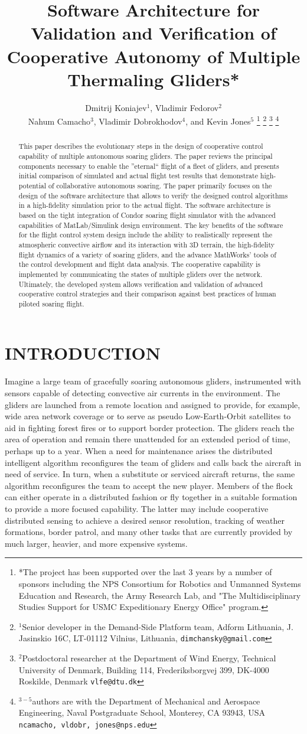 \documentclass[letterpaper, 10 pt, conference]{ieeeconf}  %
\title{\LARGE \bf
Software Architecture for Validation and Verification of Cooperative Autonomy of Multiple
Thermaling Gliders*
}
\author{Dmitrij Koniajev$^{1}$, Vladimir Fedorov$^{2}$ \\
    Nahum Camacho$^{3}$, Vladimir Dobrokhodov$^{4}$, and Kevin Jones$^{5}$%
\thanks{*The project has been supported over the last 3 years by a number of
sponsors including the NPS Consortium for Robotics and Unmanned Systems
Education and Research, the Army Research Lab, and "The Multidisciplinary
Studies Support for USMC Expeditionary Energy Office" program.}%
\thanks{$^{1}$Senior developer in the Demand-Side Platform team,
        Adform Lithuania, J. Jasinskio 16C, LT-01112 Vilnius, Lithuania,
        {\tt\small {dimchansky@gmail.com}}}%
\thanks{$^{2}$Postdoctoral researcher at the Department of Wind Energy,
        Technical University of Denmark, Building 114, Frederiksborgvej 399, DK-4000 Roskilde, Denmark
        {\tt\small {vlfe@dtu.dk}}}%
\thanks{$^{3-5}$authors are with the Department of Mechanical and Aerospace Engineering,
        Naval Postgraduate School, Monterey, CA 93943, USA
        {\tt\small {ncamacho, vldobr, jones}@nps.edu}}%
} %
\begin{document}
\maketitle
\thispagestyle{empty}
\pagestyle{empty}


\begin{abstract}
This paper describes the evolutionary steps in the design of cooperative
control capability of multiple autonomous soaring gliders. The paper
reviews the principal components necessary to enable the ''eternal`` flight
of a fleet of gliders, and presents initial comparison of simulated and
actual flight test results that demonstrate high-potential of collaborative
autonomous soaring. The paper primarily focuses on the design of the
software architecture that allows to verify the designed control algorithms
in a high-fidelity simulation prior to the actual flight. The software
architecture is based on the tight integration of Condor soaring flight
simulator with the advanced capabilities of MatLab/Simulink design
environment. The key benefits of the software for the flight control system
design include the ability to realistically represent the atmospheric
convective airflow and its interaction with 3D terrain, the high-fidelity
flight dynamics of a variety of soaring gliders, and the advance MathWorks'
tools of the control development and flight data analysis. The cooperative
capability is implemented by communicating the states of multiple gliders
over the network. Ultimately, the developed system allows verification and
validation of advanced cooperative control strategies and their comparison
against best practices of human piloted soaring flight.
\end{abstract}


\section{INTRODUCTION}

Imagine a large team of gracefully soaring autonomous gliders, instrumented
with sensors capable of detecting convective air currents in the environment.
The gliders are launched from a remote location and assigned to provide, for
example, wide area network coverage or to serve as pseudo Low-Earth-Orbit
satellites to aid in fighting forest fires or to support border protection.
The gliders reach the area of operation and remain there unattended for an
extended period of time, perhaps up to a year. When a need for maintenance
arises the distributed intelligent algorithm reconfigures the team of gliders
and calls back the aircraft in need of service. In turn, when a substitute or
serviced aircraft returns, the same algorithm reconfigures the team to accept
the new player. Members of the flock can either operate in a distributed
fashion or fly together in a suitable formation to provide a more focused
capability. The latter may include cooperative distributed sensing to achieve
a desired sensor resolution, tracking of weather formations, border patrol,
and many other tasks that are currently provided by much larger, heavier, and
more expensive systems.
\end{document}
